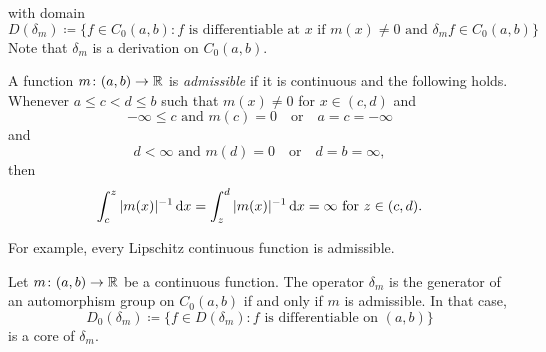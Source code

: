 with domain  
\[
D(\delta_{m}) \coloneq \{ f \in C_{0}(a,b) \colon f \text{ is differentiable at } x \text{ if } m(x) \neq 0 \text{ and } \delta_{m}f \in C_{0}(a,b) \}
\]
Note that $\delta_{m}$ is a derivation on $C_{0}(a,b)$.
\begin{definition}\label{def:b2-3.16}
%
A function $m \colon (a,b) \to \mathbb{R}$ is \emph{admissible} if it is continuous and the following holds.
Whenever $a \leq c < d \leq b$ such that $m(x) \neq 0$ for $x \in (c,d)$ and 
\[
 -\infty \leq c \text{ and } m(c) = 0
\quad \text{or} \quad
a = c = -\infty
\]
and
\[
d < \infty \text{ and } m(d) = 0
\quad \text{or} \quad
d = b = \infty, 
\]
then
\begin{equation*}\label{eq:b2-3.16-KGK.1}
\int_{c}^{z} |m(x)|^{-1} \mathop{}\!\mathrm{d}{x} = \int_{z}^{d} |m(x)|^{-1} \mathop{}\!\mathrm{d}{x} 
	= \infty \text{ for } z \in (c,d).
\end{equation*}
\end{definition}
For example, every Lipschitz continuous function is admissible.
%
\begin{theorem}\label{thm:b2-3.17}
Let $m \colon (a,b) \to \mathbb{R}$ be a continuous function. The operator $\delta_{m}$
is the generator of an automorphism group on $C_{0}(a,b)$ if and only if\/ $m$
is admissible. In that case,
\[
    D_{0}(\delta_{m}) \coloneq \{ f \in D(\delta_{m}) : f \text{ is differentiable on } (a,b)\}
\]
is a core of\/ $\delta_{m}$.
\end{theorem}
